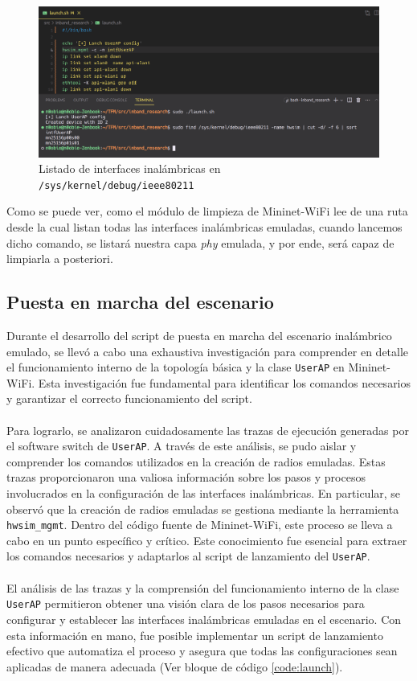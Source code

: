 \newpage

\begin{figure}[ht!]
    \centering
    \includegraphics[width=\textwidth]{archivos/img/analisis/debugBOFUSS_1.png}
    \caption{Listado de interfaces inalámbricas en \texttt{/sys/kernel/debug/ieee80211}}
    \label{fig:debugBOFUSS_1}
\end{figure}


Como se puede ver,  como el módulo de limpieza de Mininet-WiFi lee de una ruta desde la cual listan todas las interfaces inalámbricas emuladas, cuando lancemos dicho comando, se listará nuestra capa \textit{phy} emulada, y por ende, será capaz de limpiarla a posteriori.


\subsection{Puesta en marcha del escenario}

Durante el desarrollo del script de puesta en marcha del escenario inalámbrico emulado, se llevó a cabo una exhaustiva investigación para comprender en detalle el funcionamiento interno de la topología básica y la clase \texttt{UserAP} en Mininet-WiFi. Esta investigación fue fundamental para identificar los comandos necesarios y garantizar el correcto funcionamiento del script.\\
\\
Para lograrlo, se analizaron cuidadosamente las trazas de ejecución generadas por el software switch de \texttt{UserAP}. A través de este análisis, se pudo aislar y comprender los comandos utilizados en la creación de radios emuladas. Estas trazas proporcionaron una valiosa información sobre los pasos y procesos involucrados en la configuración de las interfaces inalámbricas. En particular, se observó que la creación de radios emuladas se gestiona mediante la herramienta \texttt{hwsim\_mgmt}. Dentro del código fuente de Mininet-WiFi, este proceso se lleva a cabo en un punto específico y crítico. Este conocimiento fue esencial para extraer los comandos necesarios y adaptarlos al script de lanzamiento del \texttt{UserAP}.\\
\\
El análisis de las trazas y la comprensión del funcionamiento interno de la clase \texttt{UserAP} permitieron obtener una visión clara de los pasos necesarios para configurar y establecer las interfaces inalámbricas emuladas en el escenario. Con esta información en mano, fue posible implementar un script de lanzamiento efectivo que automatiza el proceso y asegura que todas las configuraciones sean aplicadas de manera adecuada (Ver bloque de código \ref{code:launch}).\\

